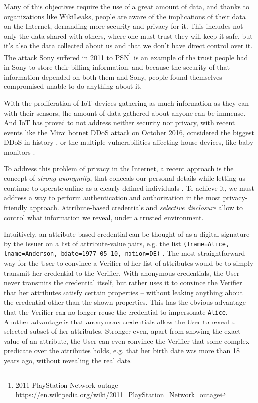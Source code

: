 \documentclass[journal]{IEEEtran}
\begin{document}
Many of this objectives require the use of a great amount of data, and thanks to organizations like WikiLeaks, people are aware of the implications of their data on the Internet, demanding more security and privacy for it. This includes not only the data shared with others, where one must trust they will keep it safe, but it's also the data collected about us and that we don't have direct control over it. The attack Sony suffered in 2011 to PSN\footnote{2011 PlayStation Network outage - 
	\url{https://en.wikipedia.org/wiki/2011_PlayStation_Network_outage}} is an example of the trust people had in Sony to store their billing information, and because the security of that information depended on both them and Sony, people found themselves compromised unable to do anything about it. 

With the proliferation of IoT devices gathering as much information as they can with their sensors, the amount of data gathered about anyone can be immense. And IoT has proved to not address neither security nor privacy, with recent events like the Mirai botnet DDoS attack on October 2016, considered the biggest DDoS in history \cite{jeyanthi:2017}, or the multiple vulnerabilities affecting house devices, like baby monitors \cite{rapid7babycam}.

To address this problem of privacy in the Internet, a recent approach is the concept of \textit{strong anonymity}, that conceals our personal details while letting us continue to operate online as a clearly defined individuals \cite{stronganonymity}. To achieve it, we must address a way to perform authentication and authorization in the most privacy-friendly approach. Attribute-based credentials and \textit{selective disclosure} allow to control what information we reveal, under a trusted environment.

Intuitively, an attribute-based credential can be thought of as a digital signature by the Issuer on a list of attribute-value pairs, e.g. the list \texttt{(fname=Alice, lname=Anderson, bdate=1977-05-10, nation=DE)} \cite{introCredIBM}.
The most straightforward way for the User to convince a Verifier of her list of attributes would be to simply transmit her credential to the Verifier.
With anonymous credentials, the User never transmits the credential itself, but rather uses it to convince the Verifier that her attributes satisfy certain properties – without leaking anything about the credential other than the shown properties. This has the obvious advantage that the Verifier can no longer reuse the credential to impersonate \texttt{Alice}. Another advantage is that anonymous credentials allow the User to reveal a selected subset of her attributes.
Stronger even, apart from showing the exact value of an attribute, the User can even convince the
Verifier that some complex predicate over the attributes holds, e.g. that her birth date was more than 18 years ago, without revealing the real date.
\end{document}
